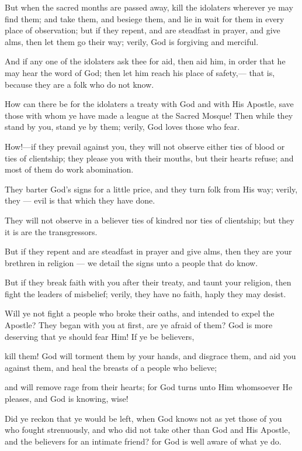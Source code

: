 \documentclass[fontsize=14pt, letterpaper, notitlepage, openany, DIV=12]{scrbook} %
\begin{document}
\noindent[9:5]
But when the sacred months are passed away, kill the idolaters wherever ye may find
them; and take them, and besiege them, and lie in wait for them in every place of observation;
but if they repent, and are steadfast in prayer, and give alms, then let them go their way; verily,
God is forgiving and merciful.

\noindent[9:6]
And if any one of the idolaters ask thee for aid, then aid him, in order that he may hear
the word of God; then let him reach his place of safety,--- that is, because they are a folk who do
not know.

\noindent[9:7]
How can there be for the idolaters a treaty with God and with His Apostle, save those
with whom ye have made a league at the Sacred Mosque! Then while they stand by you, stand ye
by them; verily, God loves those who fear.

\noindent[9:8]
How!---if they prevail against you, they will not observe either ties of blood or ties of
clientship; they please you with their mouths, but their hearts refuse; and most of them do work
abomination.

\noindent[9:9]
They barter God's signs for a little price, and they turn folk from His way; verily, they ---
evil is that which they have done.

\noindent[9:10]
They will not observe in a believer ties of kindred nor ties of clientship; but they it is are
the transgressors.

\noindent[9:11]
But if they repent and are steadfast in prayer and give alms, then they are your brethren in
religion --- we detail the signs unto a people that do know.

\noindent[9:12]
But if they break faith with you after their treaty, and taunt your religion, then fight the
leaders of misbelief; verily, they have no faith, haply they may desist.

\noindent[9:13]
Will ye not fight a people who broke their oaths, and intended to expel the Apostle? They
began with you at first, are ye afraid of them? God is more deserving that ye should fear Him! If
ye be believers,

\noindent[9:14]
kill them! God will torment them by your hands, and disgrace them, and aid you against
them, and heal the breasts of a people who believe;

\noindent[9:15]
and will remove rage from their hearts; for God turns unto Him whomsoever He pleases,
and God is knowing, wise!

\noindent[9:16]
Did ye reckon that ye would be left, when God knows not as yet those of you who fought
strenuously, and who did not take other than God and His Apostle, and the believers for an
intimate friend? for God is well aware of what ye do.
\end{document}
